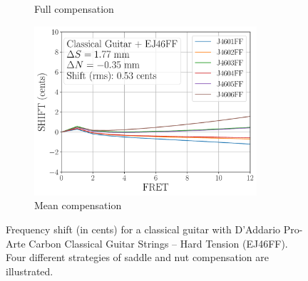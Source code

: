 \begin{figure}
\begin{subfigure}[b]{0.46\textwidth}
    \caption{Full compensation}
    \label{fig:shift_classicalguitar_ej46ff_full}
   \end{subfigure}
   \hspace{0.25in}
   \begin{subfigure}[b]{0.46\textwidth}
    \centering
    \includegraphics[width=3.25in]{figures/shift_classicalguitar_ej46ff_mean}
    \caption{Mean compensation}
    \label{fig:shift_classicalguitar_ej46ff_mean}
   \end{subfigure}
   \caption{\label{fig:compensation_classicalguitar_ej46ff} Frequency shift (in cents) for a classical guitar with D'Addario Pro-Arte Carbon Classical Guitar Strings -- Hard Tension (EJ46FF). Four different strategies of saddle and nut compensation are illustrated.}
 \end{figure}
 